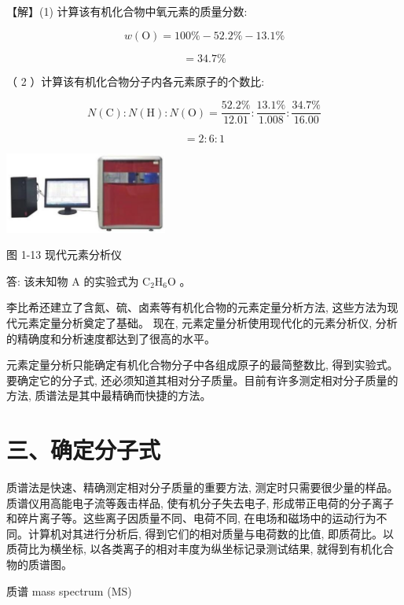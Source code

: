 \documentclass[10pt]{article}
\begin{document}
【解】(1) 计算该有机化合物中氧元素的质量分数:

\[
w\left( \mathrm{O}\right) = {100}\% - {52.2}\% - {13.1}\%
\]

\[
= {34.7}\%
\]

（ 2 ）计算该有机化合物分子内各元素原子的个数比:

\[
N\left( \mathrm{C}\right) : N\left( \mathrm{H}\right) : N\left( \mathrm{O}\right) = \frac{{52.2}\% }{12.01} : \frac{{13.1}\% }{1.008} : \frac{{34.7}\% }{16.00}
\]

\[
= 2 : 6 : 1
\]

\begin{center}
\includegraphics[max width=0.4\textwidth]{images/0190efc5-b58a-7c43-bfb0-e0a030df9cfd_22_879287.jpg}
\end{center}

图 1-13 现代元素分析仪

答: 该未知物 \(\mathrm{A}\) 的实验式为 \({\mathrm{C}}_{2}{\mathrm{H}}_{6}\mathrm{O}\) 。

李比希还建立了含氮、硫、卤素等有机化合物的元素定量分析方法, 这些方法为现代元素定量分析奠定了基础。 现在, 元素定量分析使用现代化的元素分析仪, 分析的精确度和分析速度都达到了很高的水平。

元素定量分析只能确定有机化合物分子中各组成原子的最简整数比, 得到实验式。要确定它的分子式, 还必须知道其相对分子质量。目前有许多测定相对分子质量的方法, 质谱法是其中最精确而快捷的方法。

\section*{三、确定分子式}

质谱法是快速、精确测定相对分子质量的重要方法, 测定时只需要很少量的样品。质谱仪用高能电子流等轰击样品, 使有机分子失去电子, 形成带正电荷的分子离子和碎片离子等。这些离子因质量不同、电荷不同, 在电场和磁场中的运动行为不同。计算机对其进行分析后, 得到它们的相对质量与电荷数的比值, 即质荷比。以质荷比为横坐标, 以各类离子的相对丰度为纵坐标记录测试结果, 就得到有机化合物的质谱图。

\begin{mdframed}

质谱 mass spectrum (MS)

\end{mdframed}
\end{document}
